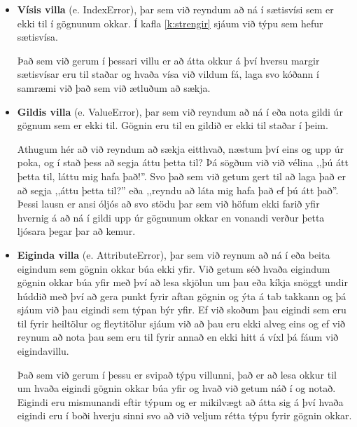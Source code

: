 \begin{itemize}[leftmargin=*]
	\item \textbf{Vísis villa} (e. IndexError), þar sem við reyndum að ná í sætisvísi sem er ekki til í gögnunum okkar.
	Í kafla \ref{k:strengir} sjáum við týpu sem hefur sætisvísa.
	
	Það sem við gerum í þessari villu er að átta okkur á því hversu margir sætisvísar eru til staðar og hvaða vísa við vildum fá, laga svo kóðann í samræmi við það sem við ætluðum að sækja.
	
	\item \textbf{Gildis villa} (e. ValueError), þar sem við reyndum að ná í eða nota gildi úr gögnum sem er ekki til.
	Gögnin eru til en gildið er ekki til staðar í þeim.
	
	Athugum hér að við reyndum að sækja eitthvað, næstum því eins og upp úr poka, og í stað þess að segja áttu þetta til? Þá sögðum við við vélina ,,þú átt þetta til, láttu mig hafa það!''. Svo það sem við getum gert til að laga það er að segja ,,áttu þetta til?'' eða ,,reyndu að láta mig hafa það ef þú átt það''. 
	Þessi lausn er ansi óljós að svo stödu þar sem við höfum ekki farið yfir hvernig á að ná í gildi upp úr gögnunum okkar en vonandi verður þetta ljósara þegar þar að kemur.
	
	\item \textbf{Eiginda villa} (e. AttributeError), þar sem við reynum að ná í eða beita eigindum sem gögnin okkar búa ekki yfir.
	Við getum séð hvaða eigindum gögnin okkar búa yfir með því að lesa skjölun um þau eða kíkja snöggt undir húddið með því að gera punkt fyrir aftan gögnin og ýta á tab takkann  og þá sjáum við þau eigindi sem týpan býr yfir.
	Ef við skoðum þau eigindi sem eru til fyrir heiltölur og fleytitölur sjáum við að þau eru ekki alveg eins og ef við reynum að nota þau sem eru til fyrir annað en ekki hitt á víxl þá fáum við eigindavillu.
	
	Það sem við gerum í þessu er svipað týpu villunni, það er að lesa okkur til um hvaða eigindi gögnin okkar búa yfir og hvað við getum náð í og notað.
	Eigindi eru mismunandi eftir týpum og er mikilvægt að átta sig á því hvaða eigindi eru í boði hverju sinni svo að við veljum rétta týpu fyrir gögnin okkar.
\end{itemize}

\newpage

